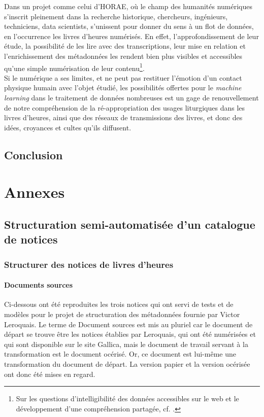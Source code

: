 \documentclass[a4paper,12pt,twoside]{book}
\begin{document}
	Dans un projet comme celui d'HORAE, où le champ des humanités numériques s'inscrit pleinement dans la recherche historique, chercheurs, ingénieurs, techniciens, data scientists, s'unissent pour donner du sens à un flot de données, en l'occurrence les livres d'heures numérisés. En effet, l'approfondissement de leur étude, la possibilité de les lire avec des transcriptions, leur mise en relation et l'enrichissement des métadonnées les rendent bien plus visibles et accessibles qu'une simple numérisation de leur contenu\footnote{Sur les questions d'intelligibilité des données accessibles sur le web et le développement d'une compréhension partagée, cf. \cite[p. 38-60]{switching_codes}.}. \\
	
	Si le numérique a ses limites, et ne peut pas restituer l'émotion d'un contact physique humain avec l'objet étudié, les possibilités offertes pour le \textit{machine learning} dans le traitement de données nombreuses est un gage de renouvellement de notre compréhension de la ré-appropriation des usages liturgiques dans les livres d'heures, ainsi que des réseaux de transmissions des livres, et donc des idées, croyances et cultes qu'ils diffusent.

	
	\chapter*{Conclusion}
	
	\appendix
	\part*{Annexes}	
	
	\chapter{Structuration semi-automatisée d'un catalogue de notices}
	
	\section{Structurer des notices de livres d'heures}
	
	\subsection{\label{doc_sources}Documents sources}
	
	Ci-dessous ont été reproduites les trois notices qui ont servi de tests et de modèles pour le projet de structuration des métadonnées fournie par Victor Leroquais. Le terme de \og Document sources\fg{} est mis au pluriel car le document de départ se trouve être les notices établies par Leroquais, qui ont été numérisées et qui sont disponible sur le site Gallica, mais le document de travail servant à la transformation est le document océrisé. Or, ce document est lui-même une transformation du document de départ. La version papier et la version océrisée ont donc été mises en regard.
	
\end{document}
